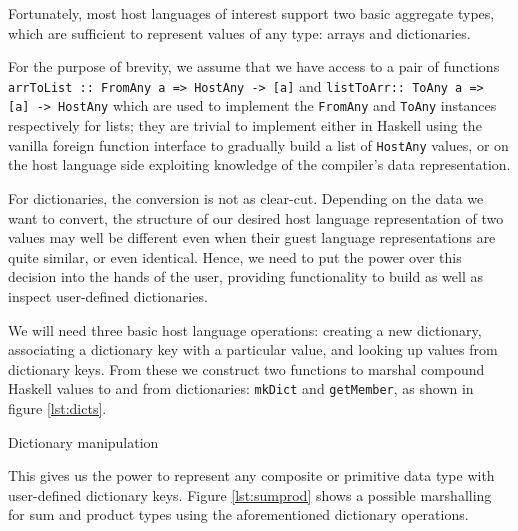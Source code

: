 \documentclass[preprint]{sigplanconf}
\begin{document}
Fortunately, most host languages of interest support two basic aggregate types,
which are sufficient to represent values of any type: arrays and dictionaries.

For the purpose of brevity, we assume that we have
access to a pair of functions
\lstinline!arrToList :: FromAny a => HostAny -> [a]!
and \lstinline!listToArr:: ToAny a => [a] -> HostAny!
which are used to implement the \lstinline!FromAny! and \lstinline!ToAny!
instances respectively for lists;
they are trivial to implement either in Haskell using the vanilla foreign
function interface to gradually build a list of \lstinline!HostAny! values,
or on the host language side exploiting knowledge of the compiler's
data representation.

For dictionaries, the conversion is not as clear-cut. Depending on the data
we want to convert, the structure of our desired host language representation
of two values may well be different even when their guest language
representations are quite similar, or even identical.
Hence, we need to put the power over this decision into the hands of the user,
providing functionality to build as well as inspect user-defined dictionaries.

We will need three basic host language operations: creating a new dictionary,
associating a dictionary key with a particular value, and looking up values
from dictionary keys. From these we construct two functions to marshal compound
Haskell values to and from dictionaries: \lstinline!mkDict!
and \lstinline!getMember!, as shown in figure \ref{lst:dicts}.

\begin{listingfloat}
\caption{Dictionary manipulation}
\label{lst:dicts}
\end{listingfloat}

This gives us the power to represent any composite or primitive data
type with user-defined dictionary keys. Figure \ref{lst:sumprod} shows a
possible marshalling for sum and product types using the aforementioned
dictionary operations.
\end{document}
